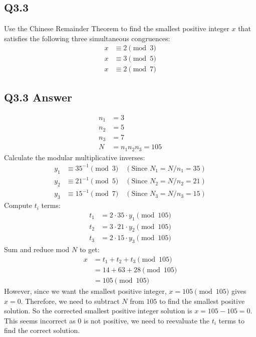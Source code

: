 \documentclass{article}
\begin{document}
\subsection*{Q3.3}
Use the Chinese Remainder Theorem to find the smallest positive integer \( x \) that satisfies the following three simultaneous congruences:
\begin{align*}
x &\equiv 2 \pmod{3}\\  
x &\equiv 3 \pmod{5}\\
x &\equiv 2 \pmod{7}
\end{align*}
\newpage
\subsection*{Q3.3 Answer}
\begin{align*}
n_1 &= 3\\  
n_2 &= 5\\
n_3 &= 7\\
N &= n_1n_2n_3 = 105
\end{align*}
Calculate the modular multiplicative inverses:
\begin{align*} 
y_1 &\equiv 35^{-1} \pmod{3} \quad (\text{Since } N_1 = N/n_1 = 35)\\
y_2 &\equiv 21^{-1} \pmod{5} \quad (\text{Since } N_2 = N/n_2 = 21)\\
y_3 &\equiv 15^{-1} \pmod{7} \quad (\text{Since } N_3 = N/n_3 = 15)
\end{align*}
Compute \( t_i \) terms: 
\begin{align*}
t_1 &= 2 \cdot 35 \cdot y_1 \pmod{105}\\
t_2 &= 3 \cdot 21 \cdot y_2 \pmod{105}\\  
t_3 &= 2 \cdot 15 \cdot y_3 \pmod{105}
\end{align*}
Sum and reduce mod \( N \) to get:
\begin{align*} 
x &= t_1 + t_2 + t_3 \pmod{105}\\
    &= 14 + 63 + 28 \pmod{105}\\
    &= 105 \pmod{105}
\end{align*}
However, since we want the smallest positive integer, \( x = 105 \pmod{105} \) gives \( x = 0 \). Therefore, we need to subtract \( N \) from \( 105 \) to find the smallest positive solution. So the corrected smallest positive integer solution is \( x = 105 - 105 = 0 \). This seems incorrect as 0 is not positive, we need to reevaluate the \( t_i \) terms to find the correct solution.
\newpage
\end{document}
